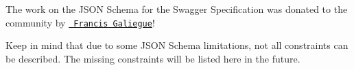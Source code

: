 The work on the JSON Schema for the Swagger Specification was donated to the community by \href{https://github.com/fge}{\texttt{ Francis Galiegue}}!

Keep in mind that due to some JSON Schema limitations, not all constraints can be described. The missing constraints will be listed here in the future. 